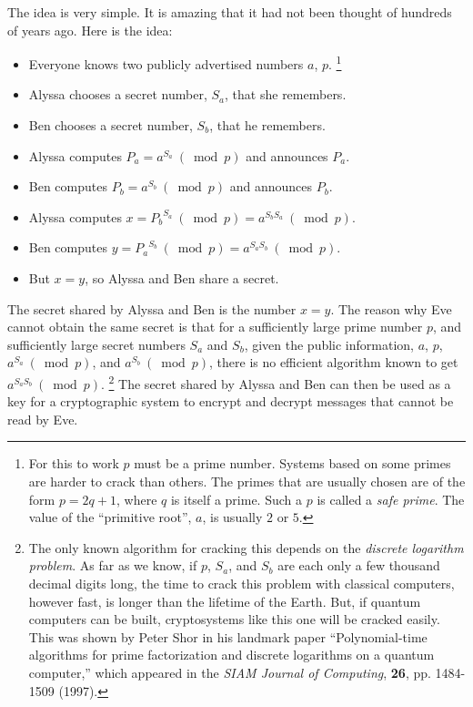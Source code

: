 The idea is very simple.  It is amazing that it had not been thought
of hundreds of years ago.  Here is the idea:
\begin{itemize}
\item Everyone knows two publicly advertised numbers $a$, $p$.%
\footnote{For this to work $p$ must be a prime number.  Systems based
  on some primes are harder to crack than others.  The primes that are
  usually chosen are of the form $p=2q+1$, where $q$ is itself a
  prime.  Such a $p$ is called a {\em safe prime}.  The value of the
  ``primitive root'', $a$, is usually $2$ or $5$.}
\item Alyssa chooses a secret number, $S_a$, that she remembers.
\item Ben chooses a secret number, $S_b$, that he remembers.
\item Alyssa computes $P_a = a^{S_a}\  (\bmod p)$ and announces $P_a$.
\item Ben computes $P_b = a^{S_b}\  (\bmod p)$ and announces $P_b$.
\item Alyssa computes $x = {P_b}^{S_a}\  (\bmod p) = a^{S_b S_a}\  (\bmod p)$.
\item Ben computes $y = {P_a}^{S_b}\  (\bmod p) = a^{S_a S_b}\  (\bmod p)$.
\item But ${x=y}$, so Alyssa and Ben share a secret.
\end{itemize}
The secret shared by Alyssa and Ben is the number $x=y$.
The reason why Eve cannot obtain the same secret is that for a
sufficiently large prime number $p$, and sufficiently large secret
numbers $S_a$ and $S_b$, given the public information, $a$, $p$,
$a^{S_a}\  (\bmod p)$, and $a^{S_b}\  (\bmod p)$, there is no efficient
algorithm known to get $a^{S_a S_b}\  (\bmod p)$.%
\footnote{The only known algorithm for cracking this depends on 
  the {\em discrete logarithm problem}.  As far as we know,
  if $p$, $S_a$, and $S_b$ are each only a few thousand decimal digits
  long, the time to crack this problem with classical computers,
  however fast, is longer than the lifetime of the Earth.
  But, if quantum computers can be built, cryptosystems like this one 
  will be cracked easily.  This was shown by Peter Shor in his
  landmark paper ``Polynomial-time algorithms for prime factorization
  and discrete logarithms on a quantum computer,'' which appeared in
  the {\em SIAM Journal of Computing}, {\bf 26}, pp. 1484-1509 (1997).}
The secret shared by Alyssa and Ben can then be used as a key for a
cryptographic system to encrypt and decrypt messages that cannot
be read by Eve.

